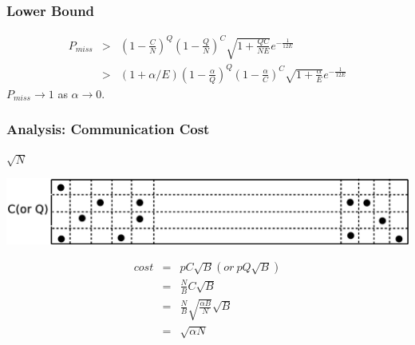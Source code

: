 \documentclass[red]{beamer}
\begin{document}
\begin{frame}
\frametitle{Lower Bound}
\begin{eqnarray}
P_{miss} &>& \left(1-\frac{C}{N}\right)^Q\left(1-\frac{Q}{N}\right)^C \sqrt{1+\frac{QC}{NE}} e^{-\frac{1}{12E}}\\
         &>& (1+\alpha/E)\left(1-\frac{\alpha}{Q}\right)^Q \left(1-\frac{\alpha}{C}\right)^C \sqrt{1+\frac{\alpha}{E}} e^{-\frac{1}{12E}}
\end{eqnarray}
$P_{miss} \rightarrow 1$ as $\alpha \rightarrow 0$.
\end{frame}

\begin{frame}
\frametitle{Analysis: Communication Cost}
\begin{center}
$\sqrt{N}$
\end{center}
\center
\includegraphics[scale=0.25]{figs/cost_area}

\begin{eqnarray*}\label{th}
cost &=& pC\sqrt{B}  (or\  pQ\sqrt{B})\\
  &=& \frac{N}{B}C\sqrt{B}\\
  &=& \frac{N}{B}\sqrt{\frac{\alpha B}{N}}\sqrt{B}\\
  &=& \sqrt{\alpha N}
\end{eqnarray*}
\end{frame}
\end{document}
